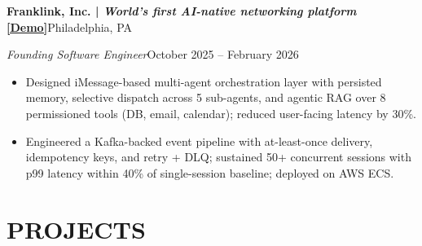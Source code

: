 \documentclass[10pt,letterpaper]{article}
\newcommand{\ressection}[1]{\section*{#1}}
\newcommand{\resheading}[4]{%
    \textbf{#1}\hfill #2\par
    \textit{#3}\hfill #4\par
}
\begin{document}
\vspace{1pt}
\resheading{Franklink, Inc. \;|\; \normalfont\textit{World's first AI-native networking platform} \textbf{\href{https://artysicistz.github.io/projects/franklink-demo.html}{[Demo]}}}{Philadelphia, PA}{Founding Software Engineer}{October 2025 -- February 2026}
\begin{itemize}
    \item Designed iMessage-based multi-agent orchestration layer with persisted memory, selective dispatch across 5 sub-agents, and agentic RAG over 8 permissioned tools (DB, email, calendar); reduced user-facing latency by 30\%.
    \item Engineered a Kafka-backed event pipeline with at-least-once delivery, idempotency keys, and retry + DLQ; sustained 50+ concurrent sessions with p99 latency within 40\% of single-session baseline; deployed on AWS ECS.
\end{itemize}

\ressection{PROJECTS}
\end{document}

